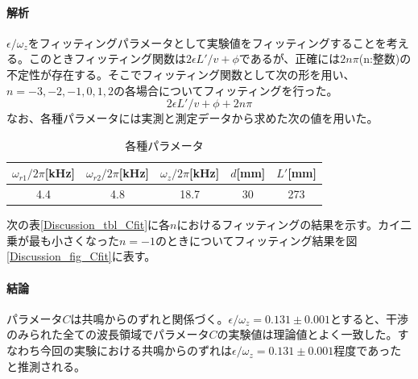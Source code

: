 \paragraph{解析}
$\epsilon/\omega_z$をフィッティングパラメータとして実験値をフィッティングすることを考える。このときフィッティング関数は$2\epsilon L'/v +\phi$であるが、正確には$2n\pi$(n:整数)の不定性が存在する。そこでフィッティング関数として次の形を用い、$n=-3,-2,-1,0,1,2$の各場合についてフィッティングを行った。
\begin{equation}
2\epsilon L'/v +\phi+2n\pi
\end{equation}
なお、各種パラメータには実測と測定データから求めた次の値を用いた。
\begin{table}[h]
\centering
\caption{各種パラメータ}\label{Discussion_tbl_parameter}
\begin{tabular}{ccccc}
$\omega_{r1}/2\pi$[kHz]&$\omega_{r2}/2\pi$[kHz]&$\omega_{z}/2\pi$[kHz]&$d$[mm]&$L'$[mm]\\ \hline
4.4&4.8&18.7&30&273
\end{tabular}
\end{table}

次の表\ref{Discussion_tbl_Cfit}に各$n$におけるフィッティングの結果を示す。カイ二乗が最も小さくなった$n=-1$のときについてフィッティング結果を図\ref{Discussion_fig_Cfit}に表す。

\paragraph{結論}
パラメータ$C$は共鳴からのずれと関係づく。$\epsilon/\omega_z=0.131\pm0.001$とすると、干渉のみられた全ての波長領域でパラメータ$C$の実験値は理論値とよく一致した。すなわち今回の実験における共鳴からのずれは$\epsilon/\omega_z=0.131\pm0.001$程度であったと推測される。

